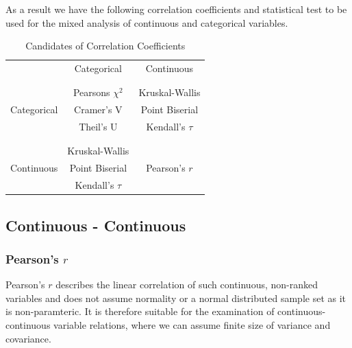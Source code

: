 \documentclass[a4paper,12pt]{report}
\begin{document}
\bigskip

As a result we have the following correlation coefficients and statistical test to be used for the mixed analysis of continuous and categorical variables. 

\bigskip

\begin{table}[ht]
	\centering
	\begin{tabular}{c|c|c}
					& Categorical 		& Continuous\\
		\\[-1em]
		\hline
		\\[-1em]
		 			& Pearsons $\chi^2$ 	& Kruskal-Wallis	\\
		Categorical	& Cramer’s V 		& Point Biserial\\
					& Theil’s U			& Kendall's $\tau$\\
		\\[-1em]
		\hline
		\\[-1em]
					& Kruskal-Wallis	  			& \\
		Continuous	& Point Biserial	& Pearson's $r$\\
				& Kendall's $\tau$		& \\
	\end{tabular}
	\caption{\label{tab:table-name}Candidates of Correlation Coefficients}
\end{table}

\subsection{Continuous - Continuous}

\subsubsection{Pearson's $r$}
\label{correlation_pearson}

Pearson's $r$ describes the linear correlation of such continuous, non-ranked variables and does not assume normality or a normal distributed sample set as it is non-paramteric. It is therefore suitable for the examination of continuous-continuous variable relations, where we can assume finite size of variance and covariance. \cite{BenestyChenHuang2009,Sulthan2018}
 
\end{document}
